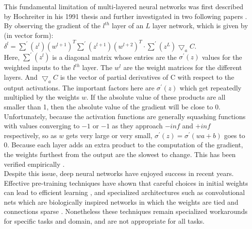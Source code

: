 \documentclass[12pt,oneside]{CUNY_CS_PhD}
\begin{document}
This fundamental limitation of multi-layered neural networks was first described by Hochreiter in his 1991 thesis \cite{hochreiter1991untersuchungen} and further investigated in two following papers \cite{hochreiter1998vanishing, hochreiter2001gradient}. By observing the gradient of the $l^{th}$ layer of an $L$ layer network, which is given by (in vector form):\\ $\delta^l = \sum^\prime(z^l)(w^{l+1})^T \sum^\prime(z^{l+1})(w^{l+2})^T \cdot \sum^\prime(z^L)\bigtriangledown_a C$. \\
Here, $\sum^\prime(z^l)$ is a diagonal matrix whose entries are the $\sigma^\prime(z)$ values for the weighted inputs to the $l^{th}$ layer. The $w^l$ are the weight matrices for the different layers. And $\bigtriangledown_a C$ is the vector of partial derivatives of C with respect to the output activations. The important factors here are $\sigma^\prime(z)$ which get repeatedly multiplied by the weights $w$. If the absolute value of these products are all smaller than 1, then the absolute value of the gradient will be close to 0. Unfortunately, because the activation functions are generally squashing functions with values converging to $-1$ or $-1$ as they approach $-inf$ and $+inf$ respectively, so as $w$ gets very large or very small, $\sigma^\prime(z) = \sigma^\prime  (wa+b)$ goes to 0. Because each layer adds an extra product to the computation of the gradient, the weights furthest from the output are the slowest to change. This has been verified empirically \cite{backpropNielsen2014, glorot2010understanding, lecun2012efficient}.\\
Despite this issue, deep neural networks have enjoyed success in recent years. Effective pre-training techniques have shown that careful choices in initial weights can lead to efficient learning \cite{sutskever2013importance}, and specialized architectures such as convolutional nets which are biologically inspired networks in which the weights are tied and connections sparse \cite{collobert_unified_2008, krizhevsky2012imagenet}. Nonetheless these techniques remain specialized workarounds for specific tasks and domain, and are not appropriate for all tasks.
\end{document}
